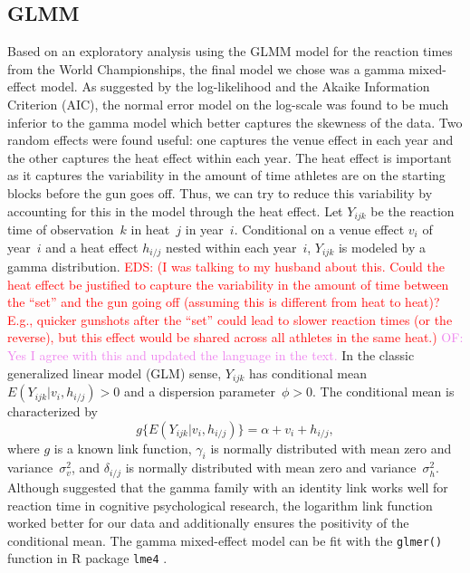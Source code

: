 \documentclass[12pt, letterpaper, titlepage]{article}
\newcommand{\eds}[1]{\textcolor{red}{EDS: (#1)}}
\newcommand{\of}[1]{\textcolor{violet}{OF: #1}}
\begin{document}
\subsection{GLMM}\label{sec:glmm}
Based on an exploratory analysis using the GLMM model for the reaction times
from the World Championships, the final model we chose was a gamma mixed-effect 
model. As suggested by the log-likelihood and the Akaike Information
Criterion (AIC), the normal error model on the log-scale was found to be
much inferior to the gamma model which better captures the skewness of the
data. Two random effects were found useful: one captures the venue effect in
each year and the other captures the heat effect within each year.  The heat
effect is important as it captures the variability in the amount of time
athletes are on the starting blocks before the gun goes off.  Thus, we can try
to reduce this variability by accounting for this in the model through the heat
effect.
Let $Y_{ijk}$ be the reaction time of observation~$k$ in heat~$j$ in year~$i$.
Conditional on a venue effect $v_i$ of year~$i$ and a heat effect
$h_{i/j}$ nested within each year~$i$, $Y_{ijk}$ is modeled by a
gamma distribution. 
\eds{I was talking to my husband about this. Could the heat effect be justified 
to capture the variability in the amount of time between the ``set'' and the 
gun going off (assuming this is different from heat to heat)? E.g., quicker 
gunshots after the ``set'' could lead to slower reaction times (or the reverse), 
but this effect would be shared across all athletes in the same heat.}
\of{Yes I agree with this and updated the language in the text.}
In the classic generalized linear model (GLM) sense,
$Y_{ijk}$ has conditional mean $E(Y_{ijk} | v_i, h_{i/j}) > 0$ and a
dispersion parameter~$\phi > 0$. The conditional mean is characterized by
\[
g\{E(Y_{ijk} | v_i, h_{i/j})\} = \alpha + v_i + h_{i/j},
\]
where $g$ is a known link function,
$\gamma_i$ is normally distributed with mean zero and
variance~$\sigma_v^2$, and $\delta_{i/j}$ is normally distributed with mean
zero and variance~$\sigma_h^2$.
Although \citet{lo2015idlink} suggested that the gamma 
family with an identity link works well for reaction time in cognitive
psychological research, the logarithm
link function worked better for our data and additionally ensures the positivity
of the conditional mean. The gamma mixed-effect model can be fit with the 
\texttt{glmer()} function in R package \texttt{lme4} \citep{lme4}.
\end{document}
